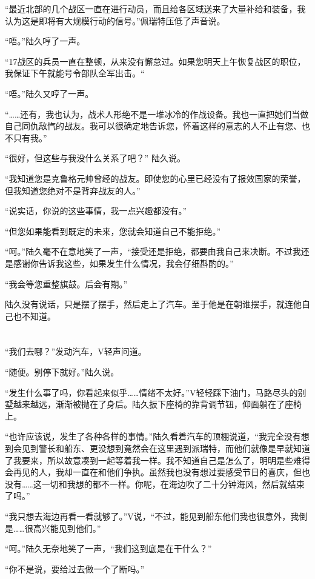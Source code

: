 “最近北部的几个战区一直在进行动员，而且给各区域送来了大量补给和装备，我认为这是即将有大规模行动的信号。”佩瑞特压低了声音说。

“唔。”陆久哼了一声。

“17战区的兵员一直在整顿，从来没有懈怠过。如果您明天上午恢复战区的职位，我保证下午就能号令部队全军出击。“

“唔。”陆久又哼了一声。

“……还有，我也认为，战术人形绝不是一堆冰冷的作战设备。我也一直把她们当做自己同仇敌忾的战友。我可以很确定地告诉您，怀着这样的意志的人不止有您、也不只有我。”

“很好，但这些与我没什么关系了吧？” 陆久说。

“我知道您是克鲁格元帅曾经的战友。即使您的心里已经没有了报效国家的荣誉，但我知道您绝对不是背弃战友的人。”

“说实话，你说的这些事情，我一点兴趣都没有。”

“但您如果能看到既定的未来，您就会知道自己不能拒绝。”

“呵。”陆久毫不在意地笑了一声，“接受还是拒绝，都要由我自己来决断。不过我还是感谢你告诉我这些，如果发生什么情况，我会仔细斟酌的。”

“我会等您重整旗鼓。后会有期。”

陆久没有说话，只是摆了摆手，然后走上了汽车。至于他是在朝谁摆手，就连他自己也不知道。

\section*{}

“我们去哪？”发动汽车，V轻声问道。

“随便。别停下就好。”陆久说。

“发生什么事了吗，你看起来似乎……情绪不太好。”V轻轻踩下油门，马路尽头的别墅越来越远，渐渐被抛在了身后。陆久扳下座椅的靠背调节钮，仰面躺在了座椅上。

“也许应该说，发生了各种各样的事情。”陆久看着汽车的顶棚说道，“我完全没有想到会见到警长和船东、更没想到竟然会在这里遇到派瑞特，而他们就像是早就知道了我要来，所以故意凑到一起等着我一样。我不知道自己是怎么了，明明是些难得会再见的人，我却一直在和他们争执。虽然我也没有想过要感受节日的喜庆，但也没有……这一切和我想的都不一样。你呢，在海边吹了二十分钟海风，然后就结束了吗。”

“我只想去海边再看一看就够了。”V说，“不过，能见到船东他们我也很意外，我倒是……很高兴能见到他们。”

“呵。”陆久无奈地笑了一声，“我们这到底是在干什么？”

“你不是说，要给过去做一个了断吗。”

